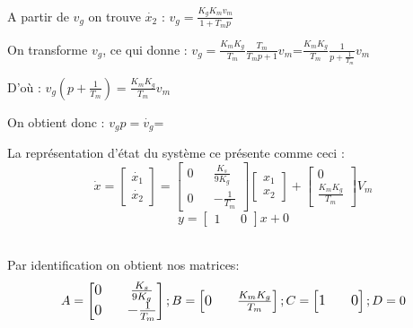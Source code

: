 \par \normalsize A partir de $v_g$ on trouve $\dot{x_2}$ : \Large$v_g=\frac{K_gK_mv_m}{1+T_mp}$\\

\par \normalsize On transforme $v_g$, ce qui donne : \Large$v_g=\frac{K_mK_g}{T_m}\frac{T_m}{T_mp+1}v_m$=$\frac{K_mK_g}{T_m}\frac{1}{p+\frac{1}{T_m}}v_m$\\

\par \normalsize D'où : \Large$v_g(p+\frac{1}{T_m})=\frac{K_mK_g}{T_m}v_m$\\

\par \normalsize On obtient donc : \Large$v_gp=\dot{v_g}$=\\

\par \normalsize La représentation d'état du système ce présente comme ceci :\large
$$\dot{x}=\begin{bmatrix}\dot{x_1}\\\dot{x_2}\end{bmatrix}=\begin{bmatrix}0 && \frac{K_s}{9K_g} \\ 0 && -\frac{1}{T_m}\end{bmatrix}\begin{bmatrix}x_1\\x_2\end{bmatrix}+\begin{bmatrix}0\\\frac{K_mK_g}{T_m}\end{bmatrix}V_m$$
$$y=\begin{bmatrix}1&&0\end{bmatrix}x+0$$\\

\par \normalsize Par identification on obtient nos matrices:
$$A=\large\begin{bmatrix}0&&\frac{K_s}{9K_g}\\0&&-\frac{1}{T_m}\end{bmatrix} ; \normalsize B=\large\begin{bmatrix}0&&\frac{K_mK_g}{T_m}\end{bmatrix} ; \normalsize C=\large\begin{bmatrix}1&&0\end{bmatrix} ; \normalsize D=\large0$$\\

